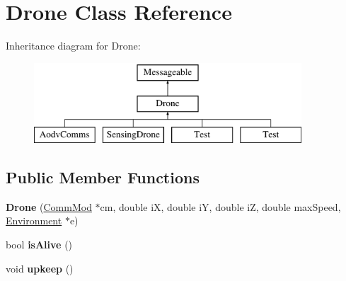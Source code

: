 \hypertarget{class_drone}{}\section{Drone Class Reference}
\label{class_drone}
Inheritance diagram for Drone\+:\begin{figure}[H]
\begin{center}
\leavevmode
\includegraphics[height=3.000000cm]{class_drone}
\end{center}
\end{figure}
\subsection*{Public Member Functions}
\begin{DoxyCompactItemize}
\item 
{\bfseries Drone} (\hyperlink{class_comm_mod}{Comm\+Mod} $\ast$cm, double iX, double iY, double iZ, double max\+Speed, \hyperlink{class_environment}{Environment} $\ast$e)\hypertarget{class_drone_a671923cbf775d479aa11f469b82503f3}{}\label{class_drone_a671923cbf775d479aa11f469b82503f3}

\item 
bool {\bfseries is\+Alive} ()\hypertarget{class_drone_a5181059ce456e7ccdf3366ee1f8156db}{}\label{class_drone_a5181059ce456e7ccdf3366ee1f8156db}

\item 
void {\bfseries upkeep} ()\hypertarget{class_drone_a4a53691055a0561e5069ea1482ac893b}{}\label{class_drone_a4a53691055a0561e5069ea1482ac893b}

\end{DoxyCompactItemize}
